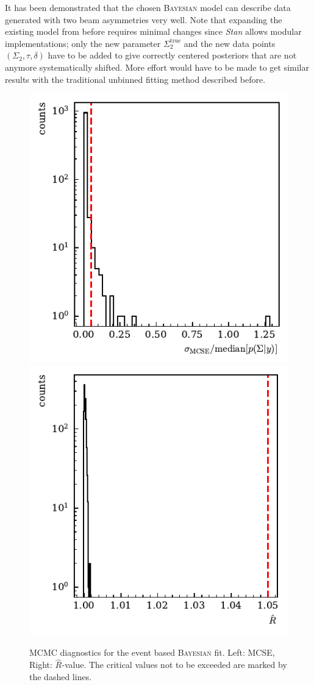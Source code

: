 It has been demonstrated that the chosen \textsc{Bayesian} model can describe data generated with two beam asymmetries very well. Note that expanding the existing model from before requires minimal changes since \emph{Stan} \cite{stan} allows modular implementations; only the new parameter $\Sigma_2^\text{true}$ and the new data points $(\Sigma_2,\tau,\delta)$ have to be added to give correctly centered posteriors that are not anymore systematically shifted. More effort would have to be made to get similar results with the traditional unbinned fitting method described before.


\begin{figure}[htbp]
	\centering
	\includegraphics[width=.49\linewidth]{../bayes/etap_event_based_fit/plots/toyMC_mcse_hist.pdf}
	\includegraphics[width=.49\linewidth]{../bayes/etap_event_based_fit/plots/toyMC_rhat_hist.pdf}
	\caption{MCMC diagnostics for the event based \textsc{Bayesian} fit. Left: MCSE, Right: $\widehat{R}$-value. The critical values not to be exceeded are marked by the dashed lines.}
	\label{fig:toyMCdiagnostics}
\end{figure}
